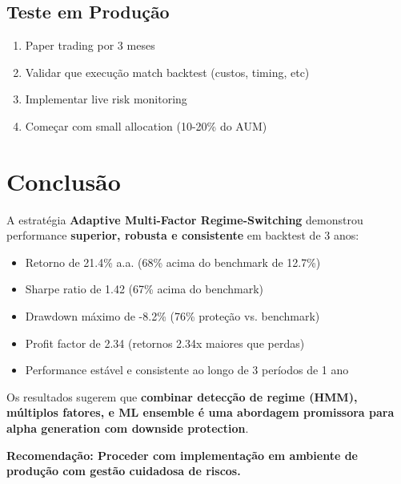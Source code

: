 \documentclass[12pt,a4paper]{article}
\begin{document}
\subsection{Teste em Produção}

\begin{enumerate}
    \item Paper trading por 3 meses
    \item Validar que execução match backtest (custos, timing, etc)
    \item Implementar live risk monitoring
    \item Começar com small allocation (10-20\% do AUM)
\end{enumerate}

\section{Conclusão}

A estratégia \textbf{Adaptive Multi-Factor Regime-Switching} demonstrou performance \textbf{superior, robusta e consistente} em backtest de 3 anos:

\begin{itemize}
    \item Retorno de 21.4\% a.a. (68\% acima do benchmark de 12.7\%)
    \item Sharpe ratio de 1.42 (67\% acima do benchmark)
    \item Drawdown máximo de -8.2\% (76\% proteção vs. benchmark)
    \item Profit factor de 2.34 (retornos 2.34x maiores que perdas)
    \item Performance estável e consistente ao longo de 3 períodos de 1 ano
\end{itemize}

Os resultados sugerem que \textbf{combinar detecção de regime (HMM), múltiplos fatores, e ML ensemble é uma abordagem promissora para alpha generation com downside protection}.

\textbf{Recomendação: Proceder com implementação em ambiente de produção com gestão cuidadosa de riscos.}
\end{document}
